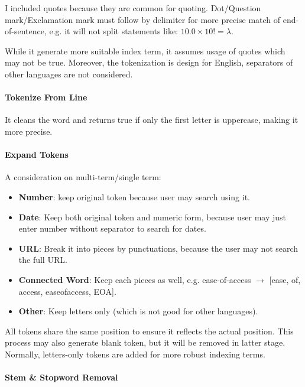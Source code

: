 \documentclass[
]{article}
\begin{document}
I included quotes because they are common for quoting. Dot/Question
mark/Exclamation mark must follow by delimiter for more precise match of
end-of-sentence, e.g. it will not split statements like:
\(10.0\times 10!=\lambda\).

While it generate more suitable index term, it assumes usage of quotes
which may not be true. Moreover, the tokenization is design for English,
separators of other languages are not considered.

\hypertarget{header-n23}{%
\paragraph{Tokenize From Line}\label{header-n23}}

It cleans the word and returns true if only the first letter is
uppercase, making it more precise.

\hypertarget{header-n33}{%
\paragraph{Expand Tokens}\label{header-n33}}

A consideration on multi-term/single term:

\begin{itemize}
\item
  \textbf{Number}: keep original token because user may search using it.
\item
  \textbf{Date}: Keep both original token and numeric form, because user
  may just enter number without separator to search for dates.
\item
  \textbf{URL}: Break it into pieces by punctuations, because the user
  may not search the full URL.
\item
  \textbf{Connected Word}: Keep each pieces as well, e.g. ease-of-access
  \(\rightarrow\) {[}ease, of, access, easeofaccess, EOA{]}.
\item
  \textbf{Other}: Keep letters only (which is not good for other
  languages).
\end{itemize}

All tokens share the same position to ensure it reflects the actual
position. This process may also generate blank token, but it will be
removed in latter stage. Normally, letters-only tokens are added for
more robust indexing terms.

\hypertarget{header-n48}{%
\paragraph{Stem \& Stopword Removal}\label{header-n48}}
\end{document}
